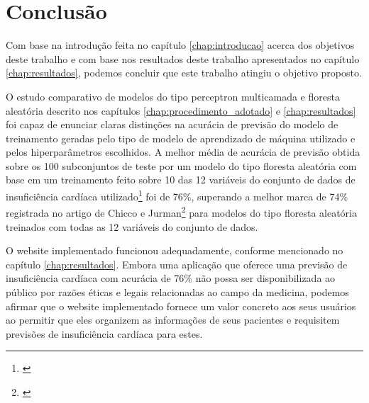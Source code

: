 \chapter{Conclusão} \label{chap:conclusao}

Com base na introdução feita no capítulo \ref{chap:introducao} acerca dos objetivos deste trabalho e com base nos resultados deste trabalho apresentados no capítulo \ref{chap:resultados}, podemos concluir que este trabalho atingiu o objetivo proposto.

O estudo comparativo de modelos do tipo perceptron multicamada e floresta aleatória descrito nos capítulos \ref{chap:procedimento_adotado} e \ref{chap:resultados} foi capaz de enunciar claras distinções na acurácia de previsão do modelo de treinamento geradas pelo tipo de modelo de aprendizado de máquina utilizado e pelos hiperparâmetros escolhidos. A melhor média de acurácia de previsão obtida sobre os 100 subconjuntos de teste por um modelo do tipo floresta aleatória com base em um treinamento feito sobre 10 das 12 variáveis do conjunto de dados de insuficiência cardíaca utilizado\footnote{\cite{larxel_dataset}} foi de 76\%, superando a melhor marca de 74\% registrada no artigo de Chicco e Jurman\footnote{\cite{chicco2020}} para modelos do tipo floresta aleatória treinados com todas as 12 variáveis do conjunto de dados.

O website implementado funcionou adequadamente, conforme mencionado no capítulo \ref{chap:resultados}. Embora uma aplicação que oferece uma previsão de insuficiência cardíaca com acurácia de 76\% não possa ser disponibilizada ao público por razões éticas e legais relacionadas ao campo da medicina, podemos afirmar que o website implementado fornece um valor concreto aos seus usuários ao permitir que eles organizem as informações de seus pacientes e requisitem previsões de insuficiência cardíaca para estes.
